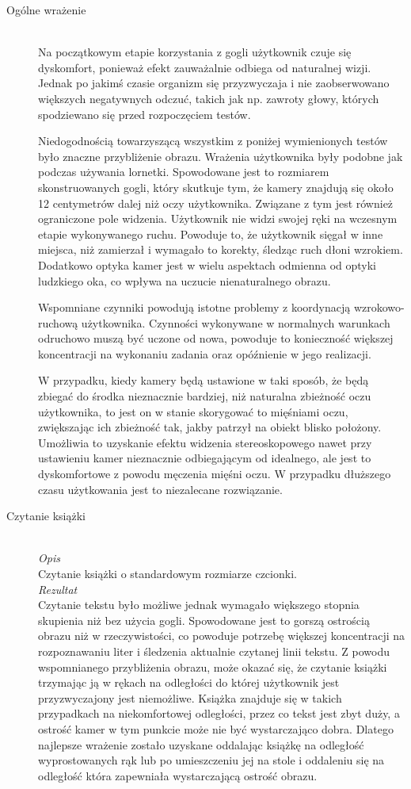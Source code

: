 \documentclass[a4paper,11pt,twoside]{report}
\theoremstyle{definition}
\begin{document}
\begin{description}
\item[Ogólne wrażenie] \hfill \\
Na początkowym etapie korzystania z gogli użytkownik czuje się dyskomfort, ponieważ efekt zauważalnie odbiega od naturalnej wizji. Jednak po jakimś czasie organizm się przyzwyczaja i nie zaobserwowano większych negatywnych odczuć, takich jak np. zawroty głowy, których spodziewano się przed rozpoczęciem testów.

Niedogodnością towarzyszącą wszystkim z poniżej wymienionych testów było znaczne przybliżenie obrazu. Wrażenia użytkownika były podobne jak podczas używania lornetki. Spowodowane jest to rozmiarem skonstruowanych gogli, który skutkuje tym, że kamery znajdują się około 12 centymetrów dalej niż oczy użytkownika. Związane z tym jest również ograniczone pole widzenia. Użytkownik nie widzi swojej ręki na wczesnym etapie wykonywanego ruchu. Powoduje to, że użytkownik sięgał w inne miejsca, niż zamierzał i wymagało to korekty, śledząc ruch dłoni wzrokiem. Dodatkowo optyka kamer jest w wielu aspektach odmienna od optyki ludzkiego oka, co wpływa na uczucie nienaturalnego obrazu.

Wspomniane czynniki powodują istotne problemy z koordynacją wzrokowo-ruchową użytkownika. Czynności wykonywane w normalnych warunkach odruchowo muszą  być uczone od nowa,  powoduje to konieczność większej koncentracji na wykonaniu zadania oraz opóźnienie w jego realizacji.

W przypadku, kiedy kamery będą ustawione w taki sposób, że będą zbiegać do środka nieznacznie bardziej, niż naturalna zbieżność oczu użytkownika, to jest on w stanie skorygować to mięśniami oczu, zwiększając ich zbieżność tak, jakby patrzył na obiekt blisko położony. Umożliwia to uzyskanie efektu widzenia stereoskopowego nawet przy ustawieniu kamer nieznacznie odbiegającym od idealnego, ale jest to dyskomfortowe z powodu męczenia mięśni oczu. W przypadku dłuższego czasu użytkowania jest to niezalecane rozwiązanie.

\item[Czytanie książki] \hfill \\
\textit{Opis} \\
Czytanie książki o standardowym rozmiarze czcionki. \\

\textit{Rezultat} \\
Czytanie tekstu było możliwe jednak wymagało większego stopnia skupienia niż bez użycia gogli. Spowodowane jest to gorszą ostrością obrazu niż w rzeczywistości, co powoduje potrzebę większej koncentracji na rozpoznawaniu liter i śledzenia aktualnie czytanej linii tekstu. Z powodu wspomnianego przybliżenia obrazu, może okazać się, że czytanie książki trzymając ją w rękach na odległości do której użytkownik jest przyzwyczajony jest niemożliwe. Książka znajduje się w takich przypadkach na niekomfortowej odległości, przez co tekst jest zbyt duży, a ostrość kamer w tym punkcie może nie być wystarczająco dobra. Dlatego najlepsze wrażenie zostało uzyskane oddalając książkę na odległość wyprostowanych rąk lub po umieszczeniu jej na stole i oddaleniu się na odległość która zapewniała wystarczającą ostrość obrazu.    


\end{description}
\end{document}
